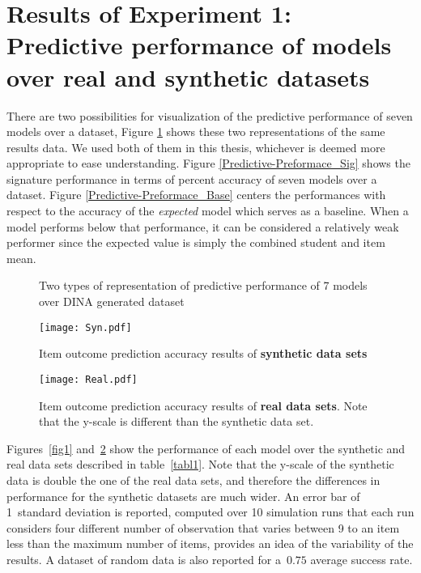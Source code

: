 \section{Results of Experiment 1: Predictive performance of models over real and synthetic datasets} \label{secSyn}

There are two possibilities for visualization of the predictive performance of seven models over a dataset, Figure \ref{Fig:Predictive-Preformace_rep} shows these two representations of the same results data. We used both of them in this thesis, whichever is deemed more appropriate to ease understanding. Figure \ref{Predictive-Preformace_Sig} shows the signature performance in terms of percent accuracy of seven models over a dataset. Figure \ref{Predictive-Preformace_Base} centers the performances with respect to the accuracy of the \textit{expected} model which serves as a baseline.  When a model performs below that performance, it can be considered a relatively weak performer since the expected value is simply the combined student and item mean.

\begin{figure}[h]
\centering
 \quad
{}
\caption{Two types of representation of predictive performance of 7 models over DINA generated dataset}
\label{Fig:Predictive-Preformace_rep}
\end{figure}


\begin{figure}
\centering
\texttt{[image: Syn.pdf]}
\caption{Item outcome prediction accuracy results of {\textbf{synthetic data sets}}}
\label{fig1}

{\texttt{[image: Real.pdf]}}
\caption{Item outcome prediction accuracy results of {\textbf{real data sets}}.  Note that the y-scale is different than the synthetic data set.}
\label{fig2}
\end{figure}


Figures~\ref{fig1} and~\ref{fig2} show the performance of each model over the synthetic and real data sets described in table~\ref{tabl1}. Note that the y-scale of the synthetic data is double the one of the real data sets, and therefore the differences in performance for the synthetic datasets are much wider.  An error bar of 1~standard deviation is reported, computed over 10 simulation runs that each run considers four different number of observation that varies between 9 to an item less than the maximum number of items, provides an idea of the variability of the results. A dataset of random data is also reported for a~$0.75$ average success rate.


